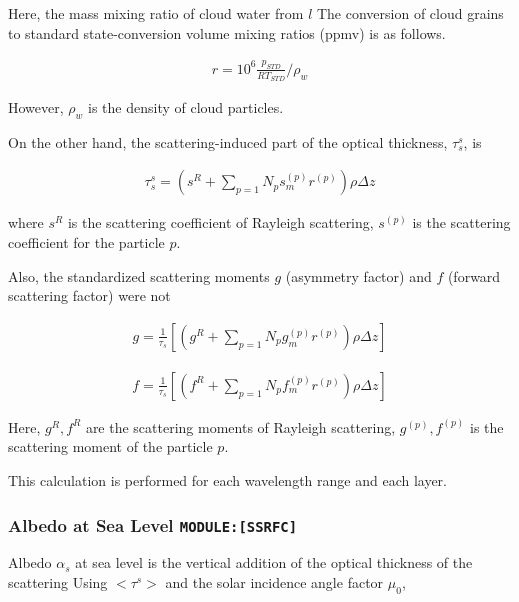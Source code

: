 Here, the mass mixing ratio of cloud water from \(l\) The conversion of
cloud grains to standard state-conversion volume mixing ratios (ppmv) is
as follows.

\begin{eqnarray}
  r = 10^6 \frac{p_{STD}}{R T_{STD}}/\rho_w
\end{eqnarray}

However, \(\rho_w\) is the density of cloud particles.

On the other hand, the scattering-induced part of the optical thickness,
\(\tau_s^s\), is

\begin{eqnarray}
\tau_s^{s} 
 = \left( s^R + \sum_{p=1}{N_p} s^{(p)}_m r^{(p)}\right) \rho \Delta z
\end{eqnarray}

where \(s^R\) is the scattering coefficient of Rayleigh scattering,
\(s^{(p)}\) is the scattering coefficient for the particle \(p\).

Also, the standardized scattering moments \(g\) (asymmetry factor) and
\(f\) (forward scattering factor) were not

\begin{eqnarray}
g = \frac{1}{\tau_s} \left[
    \left( g^R + \sum_{p=1}{N_p} g^{(p)}_m r^{(p)}\right) \rho \Delta z
    \right]
\end{eqnarray}

\begin{eqnarray}
f = \frac{1}{\tau_s} \left[ 
    \left( f^R + \sum_{p=1}{N_p} f^{(p)}_m r^{(p)}\right) \rho \Delta z
    \right]
\end{eqnarray}

Here, \(g^R, f^R\) are the scattering moments of Rayleigh scattering,
\(g^{(p)}, f^{(p)}\) is the scattering moment of the particle \(p\).

This calculation is performed for each wavelength range and each layer.

\hypertarget{albedo-at-sea-level-modulessrfc}{%
\subsubsection{\texorpdfstring{Albedo at Sea Level
\texttt{MODULE:{[}SSRFC{]}}}{Albedo at Sea Level MODULE:{[}SSRFC{]}}}\label{albedo-at-sea-level-modulessrfc}}

Albedo \(\alpha_s\) at sea level is the vertical addition of the optical
thickness of the scattering Using \(<\tau^{s}>\) and the solar incidence
angle factor \(\mu_0\),


